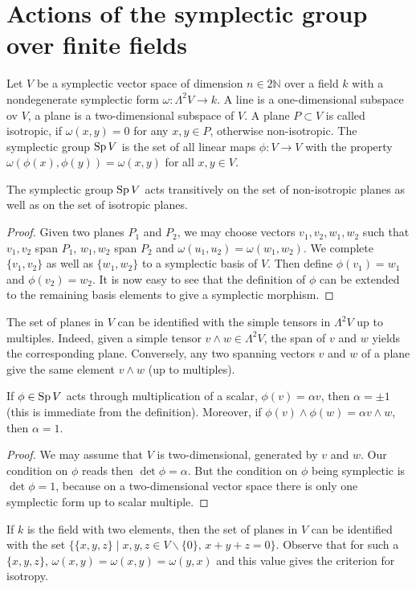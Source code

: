 \section{Actions of the symplectic group over finite fields}
Let $V$ be a symplectic vector space of dimension $n\in 2\mathbb{N}$ over a field $k$ with a nondegenerate symplectic form $\omega : \Lambda^2 V \rightarrow k$. A line is a one-dimensional subspace ov $V$, a plane is a two-dimensional subspace of $V$. A plane $P\subset V$ is called isotropic, if $\omega (x,y)=0$ for any $x,y\in P$, otherwise non-isotropic.  The symplectic group $\operatorname{Sp} V$ is the set of all linear maps $\phi : V\rightarrow V$ with the property $\omega(\phi(x),\phi(y)) = \omega(x,y)$ for all $ x,y\in V$.
\begin{proposition}
The symplectic group $\operatorname{Sp} V$ acts transitively on the set of non-isotropic planes as well as on the set of isotropic planes.
\end{proposition}
\begin{proof}
Given two planes $P_1$ and $P_2$, we may choose vectors $v_1,v_2,w_1,w_2$ such that $v_1,v_2$ span $P_1$, $w_1,w_2$ span $P_2$ and $\omega(u_1,u_2) =\omega(w_1,w_2)$. We complete $\{v_1,v_2\}$ as well as $\{w_1,w_2\}$ to a symplectic basis of $V$.
Then define $\phi(v_1)=w_1$ and $\phi(v_2)=w_2$. 
It is now easy to see that the definition of $\phi$ can be extended to the remaining basis elements to give a symplectic morphism.
\end{proof}
\begin{remark}
The set of planes in $V$ can be identified with the simple tensors in $\Lambda^2V$ up to multiples. Indeed, given a simple tensor $v\wedge w \in \Lambda^2 V$, the span of $v$ and $w$ yields the corresponding plane. Conversely, any two spanning vectors $v$ and $w$ of a plane give the same element $v\wedge w$ (up to multiples).
\end{remark}
\begin{proposition}
If $\phi\in\operatorname{Sp} V$ acts through multiplication of a scalar, $\phi(v) = \alpha v$, then $\alpha = \pm 1$ (this is immediate from the definition). Moreover, if $\phi(v)\wedge \phi(w) = \alpha v\wedge w$, then $\alpha=1$.
\end{proposition}
\begin{proof}
We may assume that $V$ is two-dimensional, generated by $v$ and $w$. Our condition on $\phi$ reads then $\det\phi = \alpha$. But the condition on $\phi$ being symplectic is $\det\phi = 1$, because on a two-dimensional vector space there is only one symplectic form up to scalar multiple. 
\end{proof}
\begin{remark} \label{PlaneTriple}
 If $k$ is the field with two elements, then the set of planes in $V$ can be identified with the set $\{\{x,y,z\}\;|\;x,y,z\in V\backslash\{0\},\,x+y+z=0\}$. Observe that for such a $\{x,y,z\}$, $\omega(x,y)=\omega(x,y)=\omega(y,x)$ and this value gives the criterion for isotropy.
\end{remark}

